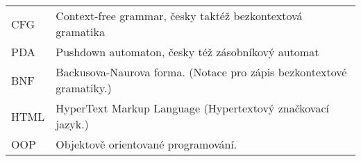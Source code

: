 
\seznamzkr

\begin{tabular}{ll}
	CFG & Context-free grammar, česky taktéž bezkontextová gramatika \\
	PDA & Pushdown automaton, česky též zásobníkový automat \\
	BNF & Backusova-Naurova forma. (Notace pro zápis bezkontextové gramatiky.) \\
	HTML & HyperText Markup Language (Hypertextový značkovací jazyk.) \\
	OOP & Objektově orientované programování. \\
\end{tabular}

